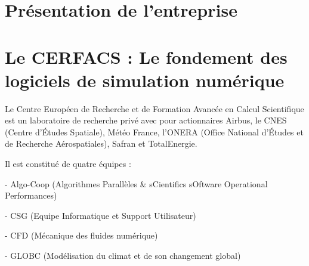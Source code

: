 \chapter{Présentation de l'entreprise}
\chapter*{Le CERFACS : Le fondement des logiciels de simulation numérique}

Le Centre Européen de Recherche et de Formation Avancée en Calcul Scientifique
est un laboratoire de recherche privé avec pour actionnaires Airbus,
le CNES (Centre d'Études Spatiale), Météo France,
l'ONERA (Office National d'Études et de Recherche Aérospatiales), Safran
et TotalEnergie.

Il est constitué de quatre équipes :

- Algo-Coop (Algorithmes Parallèles \& sCientifics sOftware Operational Performances)

- CSG (Equipe Informatique et Support Utilisateur)

- CFD (Mécanique des fluides numérique)

- GLOBC (Modélisation du climat et de son changement global)

\begin{comment}
Simuler les écoulements autour des avions, dans les moteurs, dans les bâtiments…
La CFD (Computational Fluid Dynamics) est la plus grosse équipe  du CERFACS. Elle se focalise sur la simulation des écoulements en développant des méthodes numériques avancées et en les appliquant aux avions, fusées, hélicoptères, moteurs de voitures, turbines, etc. Les liens de l’équipe CFD avec les autres équipes du CERFACS comme GLOBC ou PAE  sont forts car ces équipes utilisent aussi la CFD de façon intensive pour prévoir le changement climatique ou l’effet de l’aviaton sur l’environnement: en effet, derrière ces thèmes, on retrouve en premier les équations qui régissent les écoulements des fluides.

Calculez ce moteur avant de le construire !
L’équipe CFD développe des outils essentiels dans de nombreux domaines applicatifs avec un leitmotiv bien connu aujourd’hui dans l’industrie: calculons les systèmes (avions, moteurs…) avant de les construire. Ceci permet de diminuer le coût des essais d’un ordre de grandeur dans de nombreux cas et l’équipe CFD du CERFACS est au centre de ces travaux avec ses actionnaires. La CFD est aussi le domaine où les calculs à haute performance sont le plus présents: la CFD se fait avec des maillages contenant des milliards de points sur des machines contenant des millions de coeurs. Réaliser ces calculs de façon fiable et efficace est un autre thème central sur lequel le CERFACS est reconnu comme un acteur majeur.
\end{comment}



